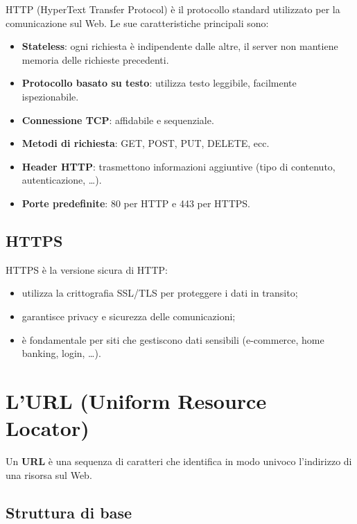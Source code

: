HTTP (HyperText Transfer Protocol) è il protocollo standard utilizzato per la comunicazione sul Web. Le sue caratteristiche principali sono:

\begin{itemize}
    \item \textbf{Stateless}: ogni richiesta è indipendente dalle altre, il server non mantiene memoria delle richieste precedenti.
    \item \textbf{Protocollo basato su testo}: utilizza testo leggibile, facilmente ispezionabile.
    \item \textbf{Connessione TCP}: affidabile e sequenziale.
    \item \textbf{Metodi di richiesta}: GET, POST, PUT, DELETE, ecc.
    \item \textbf{Header HTTP}: trasmettono informazioni aggiuntive (tipo di contenuto, autenticazione, \dots).
    \item \textbf{Porte predefinite}: 80 per HTTP e 443 per HTTPS.
\end{itemize}

\subsection{HTTPS}

HTTPS è la versione sicura di HTTP:

\begin{itemize}
    \item utilizza la crittografia SSL/TLS per proteggere i dati in transito;
    \item garantisce privacy e sicurezza delle comunicazioni;
    \item è fondamentale per siti che gestiscono dati sensibili (e-commerce, home banking, login, \dots).
\end{itemize}

\section{L'URL (Uniform Resource Locator)}

Un \textbf{URL} è una sequenza di caratteri che identifica in modo univoco l'indirizzo di una risorsa sul Web.

\subsection{Struttura di base}

